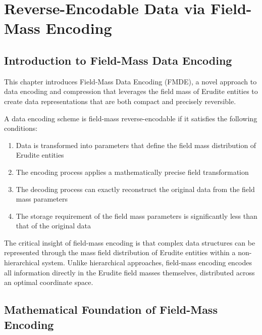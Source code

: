\chapter{Reverse-Encodable Data via Field-Mass Encoding}

\section{Introduction to Field-Mass Data Encoding}

This chapter introduces Field-Mass Data Encoding (FMDE), a novel approach to data encoding and compression that leverages the field mass of Erudite entities to create data representations that are both compact and precisely reversible.

\begin{definition}
A data encoding scheme is field-mass reverse-encodable if it satisfies the following conditions:
\begin{enumerate}
    \item Data is transformed into parameters that define the field mass distribution of Erudite entities
    \item The encoding process applies a mathematically precise field transformation
    \item The decoding process can exactly reconstruct the original data from the field mass parameters
    \item The storage requirement of the field mass parameters is significantly less than that of the original data
\end{enumerate}
\end{definition}

The critical insight of field-mass encoding is that complex data structures can be represented through the mass field distribution of Erudite entities within a non-hierarchical system. Unlike hierarchical approaches, field-mass encoding encodes all information directly in the Erudite field masses themselves, distributed across an optimal coordinate space.

\section{Mathematical Foundation of Field-Mass Encoding}

